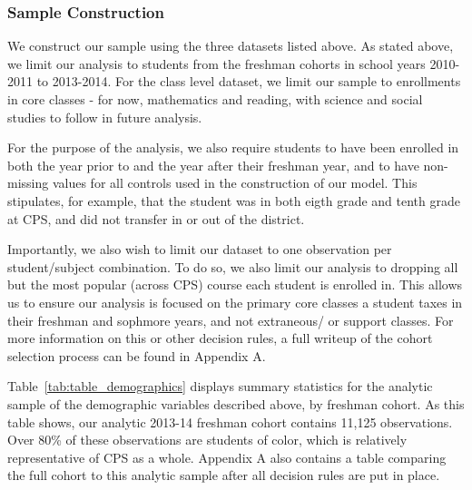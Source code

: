 \documentclass[../thesis_main.tex]{subfiles}
\begin{document}
\subsubsection{Sample Construction}

We construct our sample using the three datasets listed above. As stated above, we limit our analysis to students from the freshman cohorts in school years 2010-2011 to 2013-2014. For the class level dataset, we limit our sample to enrollments in core classes - for now, mathematics and reading, with science and social studies to follow in future analysis. %

For the purpose of the analysis, we also require students to have been enrolled in both the year prior to and the year after their freshman year, and to have non-missing values for all controls used in the construction of our model. This stipulates, for example, that the student was in both eigth grade and tenth grade at CPS, and did not transfer in or out of the district. 


Importantly, we also wish to limit our dataset to one observation per student/subject combination. To do so, we also limit our analysis to dropping all but the most popular (across CPS) course each student is enrolled in. This allows us to ensure our analysis is focused on the primary core classes a student taxes in their freshman and sophmore years, and not extraneous/ or support classes. For more information on this or other decision rules, a full writeup of the cohort selection process can be found in Appendix A. 


Table~\ref{tab:table_demographics} displays summary statistics for the analytic sample of the demographic variables described above, by freshman cohort. As this table shows, our analytic 2013-14 freshman cohort contains 11,125 observations. Over 80\% of these observations are students of color, which is relatively representative of CPS as a whole. Appendix A also contains a table comparing the full cohort to this analytic sample after all decision rules are put in place. 
\end{document}
